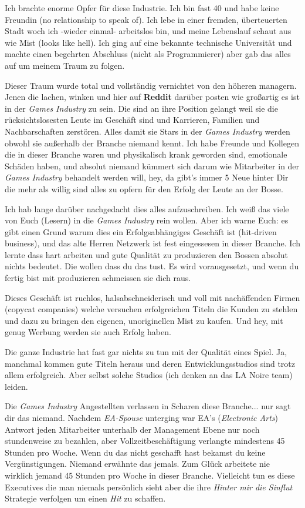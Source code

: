 Ich brachte enorme Opfer für diese Industrie. Ich bin fast 40 und habe keine Freundin  (no relationship to speak of). Ich lebe in einer fremden, überteuerten Stadt woch ich -wieder einmal- arbeitslos bin, und meine Lebenslauf schaut aus wie Mist (looks like hell). Ich ging auf eine bekannte technische Universität und machte einen begehrten Abschluss (nicht als Programmierer) aber gab das alles auf um meinem Traum zu folgen. 

Dieser Traum wurde total und vollständig vernichtet von den höheren managern. Jenen die lachen, winken und hier auf \textbf{Reddit} darüber posten wie großartig es ist in der \textit{Games Industry} zu sein. Die sind an ihre Position gelangt weil sie die rücksichtslosesten Leute im Geschäft sind und Karrieren, Familien und Nachbarschaften zerstören. Alles damit sie Stars in der \textit{Games Industry} werden obwohl sie außerhalb der Branche niemand kennt. Ich habe Freunde und Kollegen die in dieser Branche waren und physikalisch krank geworden sind, emotionale Schäden haben, und absolut niemand kümmert sich darum wie Mitarbeiter in der \textit{Games Industry} behandelt werden will, hey, da gibt's immer 5 Neue hinter Dir die mehr als willig sind alles zu opfern für den Erfolg der Leute an der Bosse.

Ich hab lange darüber nachgedacht dies alles aufzuschreiben. Ich weiß das viele von Euch (Lesern) in die \textit{Games Industry} rein wollen. Aber ich warne Euch: es gibt einen Grund warum dies ein Erfolgsabhängiges Geschäft ist (hit-driven business), und das alte Herren Netzwerk ist fest eingessesen in dieser Branche. Ich lernte dass hart arbeiten und gute Qualität zu produzieren den Bossen absolut nichts bedeutet. Die wollen dass du das tust. Es wird vorausgesetzt, und wenn du fertig bist mit produzieren schmeissen sie dich raus.

Dieses Geschäft ist ruchlos, halsabschneiderisch und voll mit nachäffenden Firmen (copycat companies) welche versuchen erfolgreichen Titeln die Kunden zu stehlen und  dazu zu bringen den eigenen, unoriginellen Mist zu kaufen. Und hey, mit genug Werbung werden sie auch Erfolg haben.

Die ganze Industrie hat fast gar nichts zu tun mit der Qualität eines Spiel. Ja, manchmal kommen gute Titeln heraus und deren Entwicklungsstudios sind trotz allem erfolgreich. Aber selbst solche Studios (ich denken an das LA Noire team) leiden.

Die \textit{Games Industry} Angestellten verlassen in Scharen diese Branche... nur sagt dir das niemand. Nachdem\textit{ EA-Spouse} unterging war EA's (\textit{Electronic Arts}) Antwort jeden Mitarbeiter unterhalb der Management Ebene nur noch stundenweise zu bezahlen, aber Vollzeitbeschäftigung verlangte mindestens 45 Stunden pro Woche. Wenn du das nicht geschafft hast bekamst du keine Vergünstigungen. Niemand erwähnte das jemals. Zum Glück arbeitete nie wirklich jemand 45 Stunden pro Woche in dieser Branche. Vielleicht tun es diese Executives die man niemals persönlich sieht aber die ihre \textit{Hinter mir die Sinflut} Strategie verfolgen um einen \textit{Hit} zu schaffen. 

